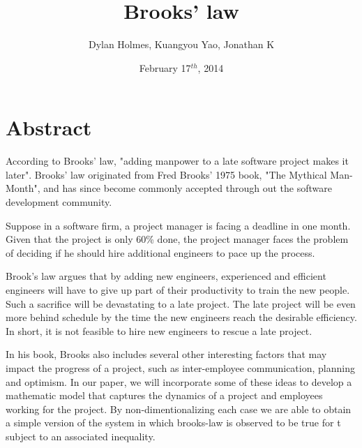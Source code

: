 \documentclass{article}
\author{Dylan Holmes, Kuangyou Yao, Jonathan K}
\title{Brooks' law}
\date{February 17$^{th}$, 2014}
\begin{document}
\maketitle

\section*{Abstract}
According to Brooks' law, "adding manpower to a late software project makes it
later". Brooks' law originated from Fred Brooks' 1975 book, "The Mythical
Man-Month", and has since become commonly accepted through out the software
development community. 

Suppose in a software firm, a project manager is facing a deadline in one month.
Given that the project is only 60\% done, the project manager faces the problem
of deciding if he should hire additional engineers to pace up the process.

Brook’s law argues that by adding new engineers, experienced and efficient
engineers will have to give up part of their productivity to train the new
people. Such a sacrifice will be devastating to a late project. The late project
will be even more behind schedule by the time the new engineers reach the
desirable efficiency. In short, it is not feasible to hire new engineers to
rescue a late project.

In his book, Brooks also includes several other interesting factors that may
impact the progress of a project, such as inter-employee communication, planning
and optimism. In our paper, we will incorporate some of these ideas to develop a
mathematic model that captures the dynamics of a project and employees working
for the project. By non-dimentionalizing each case we are able to obtain a 
simple version of the system in which brooks-law is observed to be
true for t subject to an associated inequality.
\end{document}
